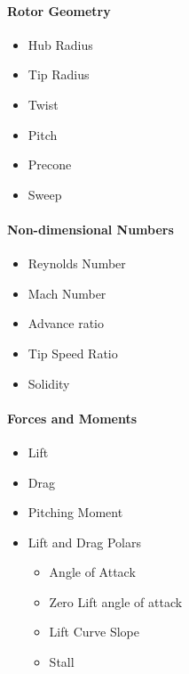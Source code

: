 \documentclass[11pt,twocolumn]{article}
\begin{document}
\paragraph{Rotor Geometry}
\begin{itemize}
	\item Hub Radius
	\item Tip Radius
	\item Twist
	\item Pitch
	\item Precone
	\item Sweep
\end{itemize}

\paragraph{Non-dimensional Numbers}
\begin{itemize}
	\item Reynolds Number
	\item Mach Number
	\item Advance ratio
	\item Tip Speed Ratio
	\item Solidity
\end{itemize}


\paragraph{Forces and Moments}
\begin{itemize}
	\item Lift
	\item Drag
	\item Pitching Moment
	\item Lift and Drag Polars
	\begin{itemize}
		\item Angle of Attack
		\item Zero Lift angle of attack
		\item Lift Curve Slope
		\item Stall
	\end{itemize}
\end{itemize}




\end{document}
